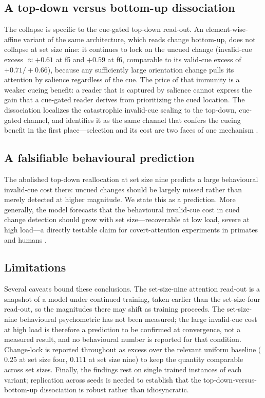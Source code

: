 \subsection{A top-down versus bottom-up dissociation}
The collapse is specific to the cue-gated top-down read-out. An element-wise-affine variant of the same architecture, which reads change bottom-up, does not collapse at set size nine: it continues to lock on the uncued change (invalid-cue excess $\approx +0.61$ at f5 and $+0.59$ at f6, comparable to its valid-cue excess of $+0.71/+0.66$), because any sufficiently large orientation change pulls its attention by salience regardless of the cue. The price of that immunity is a weaker cueing benefit: a reader that is captured by salience cannot express the gain that a cue-gated reader derives from prioritizing the cued location. The dissociation localizes the catastrophic invalid-cue scaling to the top-down, cue-gated channel, and identifies it as the same channel that confers the cueing benefit in the first place---selection and its cost are two faces of one mechanism \citep{sprague2018rescuing,herman2020attention}.

\subsection{A falsifiable behavioural prediction}
The abolished top-down reallocation at set size nine predicts a large behavioural invalid-cue cost there: uncued changes should be largely missed rather than merely detected at higher magnitude. We state this as a prediction. More generally, the model forecasts that the behavioural invalid-cue cost in cued change detection should grow with set size---recoverable at low load, severe at high load---a directly testable claim for covert-attention experiments in primates and humans \citep{posner1980attention,luo2019attention}.

\subsection{Limitations}
Several caveats bound these conclusions. The set-size-nine attention read-out is a snapshot of a model under continued training, taken earlier than the set-size-four read-out, so the magnitudes there may shift as training proceeds. The set-size-nine behavioural psychometric has not been measured; the large invalid-cue cost at high load is therefore a prediction to be confirmed at convergence, not a measured result, and no behavioural number is reported for that condition. Change-lock is reported throughout as excess over the relevant uniform baseline ($0.25$ at set size four, $0.111$ at set size nine) to keep the quantity comparable across set sizes. Finally, the findings rest on single trained instances of each variant; replication across seeds is needed to establish that the top-down-versus-bottom-up dissociation is robust rather than idiosyncratic.
